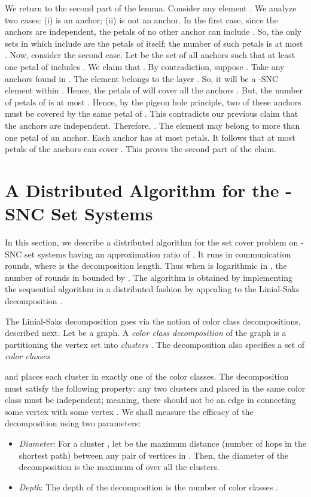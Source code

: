 \documentclass[11pt]{article}
\begin{document}
We return to the second part of the lemma.
Consider any element . We analyze two cases: (i)  is an anchor;
(ii)  is not an anchor. In the first case, since the anchors are independent,
the petals of no other anchor can include . So, the only sets in 
which include  are the petals of  itself; the number of such petals is at most .
Now, consider the second case. Let  be the set of all anchors  such that
at least one petal of  includes . We claim that .
By contradiction, suppose .
Take any  anchors  found in .
The element  belongs to the layer . So, it will be a -SNC element within
. 
Hence, the petals of  will cover all the anchors .
But, the number of petals of  is at most .
Hence, by the pigeon hole principle, two of these anchors must be covered by the 
same petal of . This contradicts our previous claim that the anchors are independent.
Therefore, . The element may belong to more than one petal of an anchor.
Each anchor  has at most  petals. 
It follows that at most  petals of the anchors can cover .
This proves the second part of the claim.

\section{A Distributed Algorithm for the -SNC Set Systems}
In this section, we describe a distributed algorithm for the set cover problem on -SNC set systems
having an approximation ratio of . It runs in 
communication rounds, where  is the decomposition length.
Thus when  is logarithmic in , the number of rounds in bounded by .
The algorithm is obtained by implementing the sequential algorithm in a distributed fashion by appealing to the Linial-Saks decomposition \cite{LS}.

The Linial-Saks decomposition goes via the notion of color class decompositions, described next.
Let  be a graph. A {\em color class decomposition}
of the graph  is a partitioning the vertex set  into {\em clusters}
.
The decomposition also specifies a set of {\em color classes}

and places each cluster  in exactly one of the color classes.
The decomposition must satisfy the following property:
any two clusters  and  placed in the same color class
must be independent; meaning, there should not be an edge in 
connecting some vertex  with some vertex .
We shall measure the efficacy of the decomposition using two parameters:
\begin{itemize}
\item
{\em Diameter}: For a cluster , let  be the maximum distance (number of hops in the
shortest path) between any pair of vertices in . Then, the diameter of the decomposition
is the maximum of  over all the clusters.
\item
{\em Depth}: The depth of the decomposition is the number of color classes .
\end{itemize}
\end{document}

